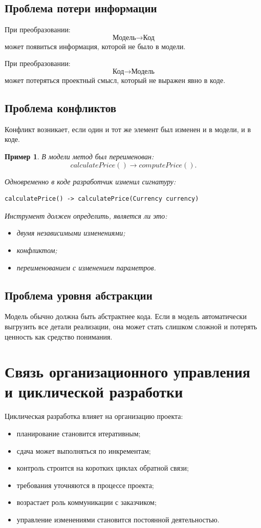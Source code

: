 \documentclass[12pt,a4paper]{article}
\newtheorem{example}{Пример}
\begin{document}
\subsection{Проблема потери информации}

При преобразовании:
\[
\text{Модель} \rightarrow \text{Код}
\]
может появиться информация, которой не было в модели.

При преобразовании:
\[
\text{Код} \rightarrow \text{Модель}
\]
может потеряться проектный смысл, который не выражен явно в коде.

\subsection{Проблема конфликтов}

Конфликт возникает, если один и тот же элемент был изменен и в модели, и в коде.

\begin{example}
В модели метод был переименован:
\[
calculatePrice() \rightarrow computePrice().
\]

Одновременно в коде разработчик изменил сигнатуру:
\begin{verbatim}
calculatePrice() -> calculatePrice(Currency currency)
\end{verbatim}

Инструмент должен определить, является ли это:
\begin{itemize}
    \item двумя независимыми изменениями;
    \item конфликтом;
    \item переименованием с изменением параметров.
\end{itemize}
\end{example}

\subsection{Проблема уровня абстракции}

Модель обычно должна быть абстрактнее кода. Если в модель автоматически выгрузить все детали реализации, она может стать слишком сложной и потерять ценность как средство понимания.

\section{Связь организационного управления и циклической разработки}

Циклическая разработка влияет на организацию проекта:
\begin{itemize}
    \item планирование становится итеративным;
    \item сдача может выполняться по инкрементам;
    \item контроль строится на коротких циклах обратной связи;
    \item требования уточняются в процессе проекта;
    \item возрастает роль коммуникации с заказчиком;
    \item управление изменениями становится постоянной деятельностью.
\end{itemize}
\end{document}

